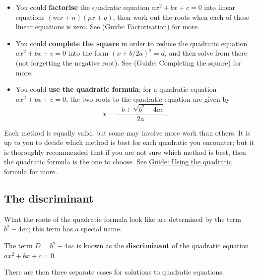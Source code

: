 \documentclass[
  12pt,
  a4paper, oneside]{starmastarticle}
\begin{document}
\begin{itemize}
\item
  You could \textbf{factorise} the quadratic equation
  \(ax^2 + bx + c = 0\) into linear equations \((mx + n)(px + q)\), then
  work out the roots when each of these linear equations is zero. See
  (Guide: Factorisation) for more.
\item
  You could \textbf{complete the square} in order to reduce the
  quadratic equation \(ax^2 + bx + c = 0\) into the form
  \((x + b/2a)^2 = d\), and then solve from there (not forgetting the
  negative root). See (Guide: Completing the square) for more.
\item
  You could \textbf{use the quadratic formula}; for a quadratic equation
  \(ax^2 + bx + c = 0\), the two roots to the quadratic equation are
  given by \[x = \frac{-b \pm \sqrt{b^2 - 4ac}}{2a}.\]
\end{itemize}

Each method is equally valid, but some may involve more work than
others. It is up to you to decide which method is best for each
quadratic you encounter; but it is thoroughly recommended that if you
are not sure which method is best, then the quadratic formula is the one
to choose. See \href{quadraticformula.qmd}{Guide: Using the quadratic
formula} for more.

\hypertarget{the-discriminant}{%
\subsection{The discriminant}\label{the-discriminant}}

What the roots of the quadratic formula look like are determined by the
term \(b^2 - 4ac\); this term has a special name.

\begin{tcolorbox}[enhanced jigsaw, bottomrule=.15mm, toprule=.15mm, coltitle=black, rightrule=.15mm, breakable, titlerule=0mm, arc=.35mm, toptitle=1mm, colback=white, opacitybacktitle=0.6, title=\textcolor{quarto-callout-note-color}{\faInfo}\hspace{0.5em}{The discriminant}, left=2mm, bottomtitle=1mm, opacityback=0, colbacktitle=quarto-callout-note-color!10!white, colframe=quarto-callout-note-color-frame, leftrule=.75mm]
The term \(D = b^2 - 4ac\) is known as the \textbf{discriminant} of the
quadratic equation \(ax^2 + bx + c = 0\).
\end{tcolorbox}

There are then three separate cases for solutions to quadratic
equations.
\end{document}
